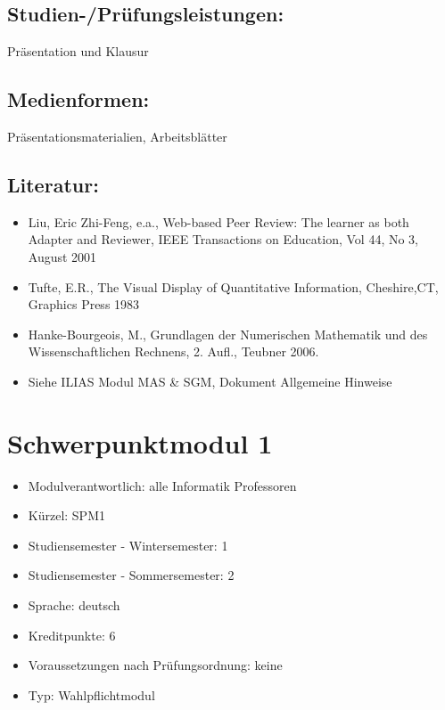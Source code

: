 \section*{Studien-/Prüfungsleistungen:}\label{studien-pruxfcfungsleistungen-2}

Präsentation und Klausur

\section*{Medienformen:}\label{medienformen-2}

Präsentationsmaterialien, Arbeitsblätter

\section*{Literatur:}\label{literatur-2}

\begin{itemize}
\item
  Liu, Eric Zhi-Feng, e.a., Web-based Peer Review: The learner as both
  Adapter and Reviewer, IEEE Transactions on Education, Vol 44, No 3,
  August 2001
\item
  Tufte, E.R., The Visual Display of Quantitative Information,
  Cheshire,CT, Graphics Press 1983
\item
  Hanke-Bourgeois, M., Grundlagen der Numerischen Mathematik und des
  Wissenschaftlichen Rechnens, 2. Aufl., Teubner 2006.
\item
  Siehe ILIAS Modul MAS \& SGM, Dokument Allgemeine Hinweise
\end{itemize}

\chapter{Schwerpunktmodul 1}\label{schwerpunktmodul-1}

\begin{itemize}
\tightlist
\item
  Modulverantwortlich: alle Informatik Professoren
\item
  Kürzel: SPM1
\item
  Studiensemester - Wintersemester: 1
\item
  Studiensemester - Sommersemester: 2
\item
  Sprache: deutsch
\item
  Kreditpunkte: 6
\item
  Voraussetzungen nach Prüfungsordnung: keine
\item
  Typ: Wahlpflichtmodul
\end{itemize}

